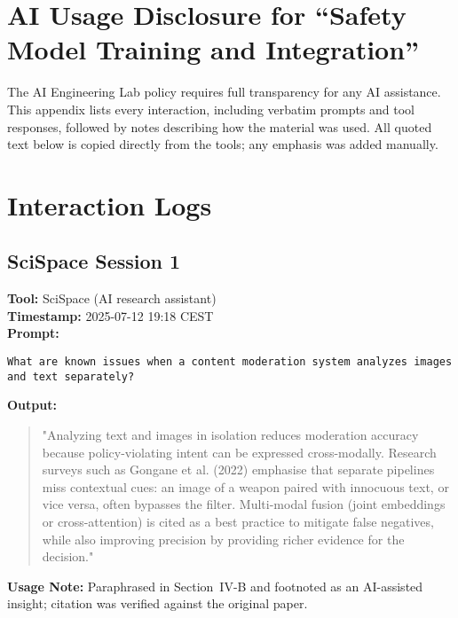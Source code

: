 \documentclass[11pt]{article}
\begin{document}
\section*{AI Usage Disclosure for ``Safety Model Training and Integration''}
The AI Engineering Lab policy requires full transparency for any AI assistance. This appendix lists every interaction, including verbatim prompts and tool responses, followed by notes describing how the material was used. All quoted text below is copied directly from the tools; any emphasis was added manually.

\section*{Interaction Logs}

\subsection*{SciSpace Session 1}
\textbf{Tool:} SciSpace (AI research assistant)\\
\textbf{Timestamp:} 2025-07-12 19:18 CEST\\
\textbf{Prompt:}
\begin{verbatim}
What are known issues when a content moderation system analyzes images
and text separately?
\end{verbatim}
\textbf{Output:}
\begin{quote}
"Analyzing text and images in isolation reduces moderation accuracy because
policy-violating intent can be expressed cross-modally. Research surveys such as
Gongane et al. (2022) emphasise that separate pipelines miss contextual cues:
an image of a weapon paired with innocuous text, or vice versa, often bypasses
the filter. Multi-modal fusion (joint embeddings or cross-attention) is cited as a
best practice to mitigate false negatives, while also improving precision by
providing richer evidence for the decision."
\end{quote}
\textbf{Usage Note:} Paraphrased in Section~IV-B and footnoted as an AI-assisted insight; citation \cite{gongane2022detection} was verified against the original paper.
\end{document}
